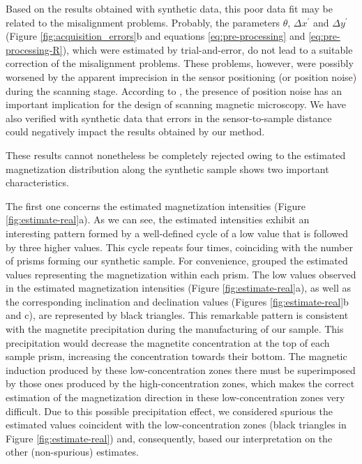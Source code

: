 \documentclass[draft,gc]{agutex}
\begin{document}
\begin{article}
Based on the results obtained with synthetic data,
this poor data fit may be related to the misalignment problems.
Probably, the parameters $\theta$, $\Delta x^{\prime}$ and 
$\Delta y^{\prime}$ (Figure \ref{fig:acquisition_errors}b and 
equations \ref{eq:pre-processing} and \ref{eq:pre-processing-R}),
which were estimated by trial-and-error, do not lead to a suitable
correction of the misalignment problems.
These problems, however, were possibly worsened by the
apparent imprecision in the sensor positioning (or position noise)
during the scanning stage.
According to \citet{lee2004}, the presence of position noise has 
an important implication for the design of scanning magnetic microscopy.
We have also verified with synthetic data that errors in the 
sensor-to-sample distance could negatively impact the results obtained
by our method.

These results cannot nonetheless be completely rejected owing to
the estimated magnetization
distribution along the synthetic sample shows two important 
characteristics. 

The first one concerns the estimated magnetization intensities 
(Figure \ref{fig:estimate-real}a).
As we can see, the estimated intensities exhibit an interesting pattern 
formed by a well-defined cycle of a low value that is followed by three higher 
values. This cycle repeats four times,
coinciding with the number of prisms forming our synthetic
sample.
For convenience, grouped the estimated values representing
the magnetization within each prism.
The low values observed in the estimated magnetization intensities
(Figure \ref{fig:estimate-real}a), as well
as the corresponding inclination and declination values
(Figures \ref{fig:estimate-real}b and c), are represented by black
triangles.
This remarkable pattern is consistent with the 
magnetite precipitation during the manufacturing of our sample.
This precipitation would decrease the magnetite concentration at the
top of each sample prism, increasing the concentration towards
their bottom.
The magnetic induction produced by these low-concentration zones
there must be superimposed by those ones produced by the 
high-concentration zones, which makes the correct estimation 
of the magnetization direction in these low-concentration zones 
very difficult.
Due to this possible precipitation effect, we considered spurious
the estimated values coincident with the low-concentration zones
(black triangles in Figure \ref{fig:estimate-real}) and, consequently,
based our interpretation on the other (non-spurious) estimates.


\end{article}
\end{document}

